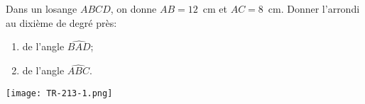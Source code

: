 
Dans un losange $ABCD$, on donne $AB=12$~cm et $AC=8$~cm. Donner l'arrondi
au dixième de degré près:
\begin{enumerate}
    \item de l'angle $\widehat{BAD}$;
    \item de l'angle $\widehat{ABC}$.
\end{enumerate}

\texttt{[image: TR-213-1.png]} 


